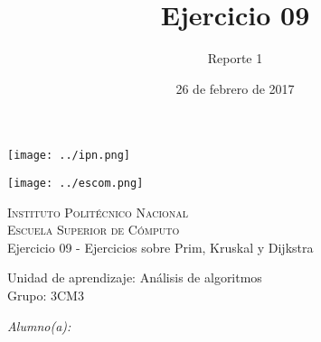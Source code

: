 \documentclass[12pt]{article}
\date{26 de febrero de 2017}
\title{Ejercicio 09}
\author{Reporte 1}
\begin{document}
\begin{titlepage}
            \begin{center}
                \noindent
                \begin{minipage}{0.5\textwidth}
                    \begin{flushleft} \large
                        \texttt{[image: ../ipn.png]}
                    \end{flushleft}
                \end{minipage}%
                \begin{minipage}{0.55\textwidth}
                    \begin{flushright} \large
                        \texttt{[image: ../escom.png]}
                    \end{flushright}
                \end{minipage}
                
                \textsc{\LARGE Instituto Politécnico Nacional}\\[0.5cm]
                
                \textsc{\Large Escuela Superior de Cómputo}\\[1cm]
                
                
                { \huge Ejercicio 09 - Ejercicios sobre Prim, Kruskal y Dijkstra \\[1cm] }
                
                { \Large Unidad de aprendizaje: Análisis de algoritmos} \\[1cm]
                
                { \Large Grupo: 3CM3 } \\[1cm]
                
                \noindent
                \begin{minipage}{0.5\textwidth}
                    \begin{flushleft} \large
                        \emph{Alumno(a):}\\
                        

\end{flushleft}
\end{minipage}
\end{center}
\end{titlepage}
\end{document}
